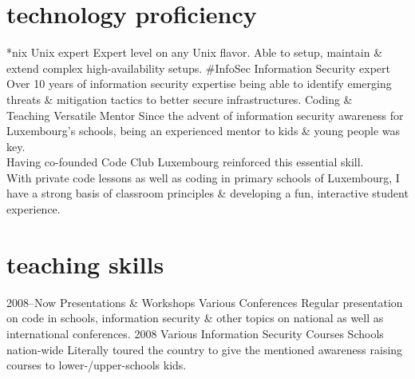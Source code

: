 \documentclass[a4paper]{friggeri-cv} %
\begin{document}

\section{technology proficiency}

\begin{entrylist}
\entry
{*nix}
{Unix expert}
{}
{Expert level on any Unix flavor. Able to setup, maintain \& extend complex high-availability setups.}
\entry
{\#InfoSec}
{Information Security expert}
{}
{Over 10 years of information security expertise being able to identify emerging threats \& mitigation tactics to better secure infrastructures.}
\entry
{Coding \& \\ Teaching}
{Versatile Mentor}
{}
{Since the advent of information security awareness for Luxembourg's schools, being an experienced mentor to kids \& young people was key. \\
Having co-founded Code Club Luxembourg reinforced this essential skill. \\
With private code lessons as well as coding in primary schools of Luxembourg, I have a strong basis of classroom principles \& developing a fun, interactive student experience.}
\end{entrylist}


\section{teaching skills}

\begin{entrylist}
\entry
{2008--Now}
{Presentations \& Workshops}
{Various Conferences}
{Regular presentation on code in schools, information security \& other topics on national as well as international conferences.}
\entry
{2008}
{Various Information Security Courses}
{Schools nation-wide}
{Literally toured the country to give the mentioned awareness raising courses to lower-/upper-schools kids.}
\end{entrylist}
\end{document}
